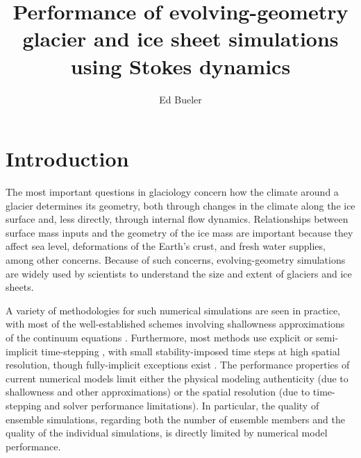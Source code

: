\documentclass[letterpaper,final,12pt,reqno]{amsart}
\begin{document}
\title[Performance of evolving-geometry simulations using Stokes dynamics]{Performance of evolving-geometry glacier and ice sheet simulations using Stokes dynamics}

\author{Ed Bueler}

\maketitle

\thispagestyle{empty}
\bigskip

\section{Introduction} \label{sec:intro}

The most important questions in glaciology concern how the climate around a glacier determines its geometry, both through changes in the climate along the ice surface and, less directly, through internal flow dynamics.  Relationships between surface mass inputs and the geometry of the ice mass are important because they affect sea level, deformations of the Earth's crust, and fresh water supplies, among other concerns.  Because of such concerns, evolving-geometry simulations are widely used by scientists to understand the size and extent of glaciers and ice sheets.

A variety of methodologies for such numerical simulations are seen in practice, with most of the well-established schemes involving shallowness approximations of the continuum equations \cite[for example]{Hoffmanetal2018,Lipscombetal2019,Winkelmannetal2011}.  Furthermore, most methods use explicit or semi-implicit time-stepping \cite{HindmarshPayne1996,Hoffmanetal2018,Lipscombetal2019,Winkelmannetal2011}, with small stability-imposed time steps at high spatial resolution, though fully-implicit exceptions exist \cite{Brinkerhoffetal2017,Bueler2016}.  The performance properties of current numerical models limit either the physical modeling authenticity (due to shallowness and other approximations) or the spatial resolution (due to time-stepping and solver performance limitations).  In particular, the quality of ensemble simulations, regarding both the number of ensemble members and the quality of the individual simulations, is directly limited by numerical model performance.
\end{document}
